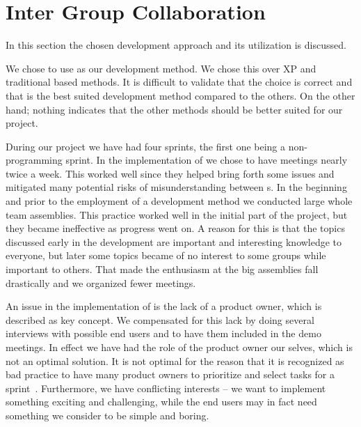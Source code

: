 \section{Inter Group Collaboration}
\label{sec:intergroup}
In this section the chosen development approach and its utilization is discussed.

We chose to use \sos{} as our development method.
We chose this over XP and traditional based methods.
It is difficult to validate that the choice is correct and that \sos{} is the best suited development method compared to the others.
On the other hand; nothing indicates that the other methods should be better suited for our project. 

During our project we have had four sprints, the first one being a non-programming sprint.
In the implementation of \sos{} we chose to have \sos{} meetings nearly twice a week.
This worked well since they helped bring forth some issues and mitigated many potential risks of misunderstanding between \subgroup{}s.
In the beginning and prior to the employment of a development method we conducted large whole team assemblies. 
This practice worked well in the initial part of the project, but they became ineffective as progress went on. 
A reason for this is that the topics discussed early in the development are important and interesting knowledge to everyone, but later some topics became of no interest to some groups while important to others.
That made the enthusiasm at the big assemblies fall drastically and we organized fewer meetings.


An issue in the implementation of \sos{} is the lack of a product owner, which is described as key concept. 
We compensated for this lack by doing several interviews with possible end users and to have them included in the demo meetings. 
In effect we have had the role of the product owner our selves, which is not an optimal solution. 
It is not optimal for the reason that it is recognized as bad \scrum{} practice to have many product owners to prioritize and select tasks for a sprint~\cite[p.~128]{Larman04}. 
Furthermore, we have conflicting interests -- we want to implement something exciting and challenging, while the end users may in fact need something we consider to be simple and boring.


